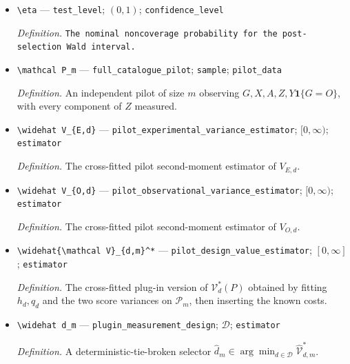 \documentclass{article}
\begin{document}
\begin{itemize}
  \par\smallskip\noindent\emph{Definition.} \texttt{The full-\allowbreak{}catalogue pilot sample size.}
  \item \texttt{\textbackslash{}\allowbreak{}eta} --- \texttt{test\_\allowbreak{}level}; \((0,1)\); \texttt{confidence\_\allowbreak{}level}
  \par\smallskip\noindent\emph{Definition.} \texttt{The nominal noncoverage probability for the post-\allowbreak{}selection Wald interval.}
  \item \texttt{\textbackslash{}\allowbreak{}mathcal P\_\allowbreak{}m} --- \texttt{full\_\allowbreak{}catalogue\_\allowbreak{}pilot}; \texttt{sample}; \texttt{pilot\_\allowbreak{}data}
  \par\smallskip\noindent\emph{Definition.} An independent pilot of size \(m\) observing \(G,X,A,Z,Y\mathbf 1\{G=O\}\), with every component of \(Z\) measured.
  \item \texttt{\textbackslash{}\allowbreak{}widehat V\_\allowbreak{}\{E,\allowbreak{}d\}\allowbreak{}} --- \texttt{pilot\_\allowbreak{}experimental\_\allowbreak{}variance\_\allowbreak{}estimator}; \([0,\infty)\); \texttt{estimator}
  \par\smallskip\noindent\emph{Definition.} The cross-fitted pilot second-moment estimator of \(V_{E,d}\).
  \item \texttt{\textbackslash{}\allowbreak{}widehat V\_\allowbreak{}\{O,\allowbreak{}d\}\allowbreak{}} --- \texttt{pilot\_\allowbreak{}observational\_\allowbreak{}variance\_\allowbreak{}estimator}; \([0,\infty)\); \texttt{estimator}
  \par\smallskip\noindent\emph{Definition.} The cross-fitted pilot second-moment estimator of \(V_{O,d}\).
  \item \texttt{\textbackslash{}\allowbreak{}widehat\{\textbackslash{}\allowbreak{}mathcal V\}\allowbreak{}\_\allowbreak{}\{d,\allowbreak{}m\}\allowbreak{}\textasciicircum{}*} --- \texttt{pilot\_\allowbreak{}design\_\allowbreak{}value\_\allowbreak{}estimator}; \([0,\infty]\); \texttt{estimator}
  \par\smallskip\noindent\emph{Definition.} The cross-fitted plug-in version of \(\mathcal V_d^*(P)\) obtained by fitting \(h_d,q_d\) and the two score variances on \(\mathcal P_m\), then inserting the known costs.
  \item \texttt{\textbackslash{}\allowbreak{}widehat d\_\allowbreak{}m} --- \texttt{plugin\_\allowbreak{}measurement\_\allowbreak{}design}; \(\mathcal D\); \texttt{estimator}
  \par\smallskip\noindent\emph{Definition.} A deterministic-tie-broken selector \(\widehat d_m\in\arg\min_{d\in\mathcal D}\widehat{\mathcal V}_{d,m}^*\).

\end{itemize}
\end{document}
